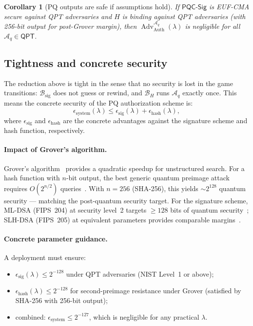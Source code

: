 \documentclass[11pt]{article}
\newtheorem{corollary}{Corollary}
\newcommand{\Adv}{\operatorname{Adv}}
\newcommand{\Aq}{\mathcal{A}_q}
\newcommand{\QPT}{\mathsf{QPT}}
\newcommand{\PQC}{\mathsf{PQC}}
\begin{document}
\begin{corollary}[PQ outputs are safe if assumptions hold]
If $\PQC\textsf{-Sig}$ is EUF-CMA secure against QPT adversaries and $H$ is binding against QPT adversaries (with 256-bit output for post-Grover margin), then $\Adv_{\mathrm{Auth}}^{\Aq}(\lambda)$ is negligible for all $\Aq\in\QPT$.
\end{corollary}

\subsection{Tightness and concrete security}\label{sec:tightness}

The reduction above is tight in the sense that no security is lost in the game transitions: $\mathcal{B}_{\mathrm{sig}}$ does not guess or rewind, and $\mathcal{B}_H$ runs $\Aq$ exactly once.
This means the concrete security of the PQ authorization scheme is:
\[
\epsilon_{\mathrm{system}}(\lambda) \le \epsilon_{\mathrm{sig}}(\lambda) + \epsilon_{\mathrm{hash}}(\lambda),
\]
where $\epsilon_{\mathrm{sig}}$ and $\epsilon_{\mathrm{hash}}$ are the concrete advantages against the signature scheme and hash function, respectively.

\paragraph{Impact of Grover's algorithm.}
Grover's algorithm~\cite{grover1996fast} provides a quadratic speedup for unstructured search.
For a hash function with $n$-bit output, the best generic quantum preimage attack requires $O(2^{n/2})$ queries~\cite{zalka1999grover}.
With $n=256$ (SHA-256), this yields $\sim 2^{128}$ quantum security --- matching the post-quantum security target.
For the signature scheme, ML-DSA (FIPS~204) at security level~2 targets $\ge 128$ bits of quantum security~\cite{fips204}; SLH-DSA (FIPS~205) at equivalent parameters provides comparable margins~\cite{fips205}.

\paragraph{Concrete parameter guidance.}
A deployment must ensure:
\begin{itemize}[leftmargin=2em]
  \item $\epsilon_{\mathrm{sig}}(\lambda) \le 2^{-128}$ under QPT adversaries (NIST Level~1 or above);
  \item $\epsilon_{\mathrm{hash}}(\lambda) \le 2^{-128}$ for second-preimage resistance under Grover (satisfied by SHA-256 with 256-bit output);
  \item combined: $\epsilon_{\mathrm{system}} \le 2^{-127}$, which is negligible for any practical $\lambda$.
\end{itemize}
\end{document}
